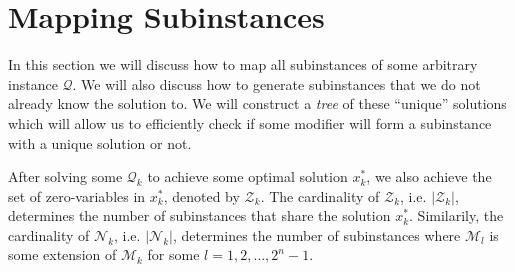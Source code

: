 \section{Mapping Subinstances}
In this section we will discuss how to map all subinstances of some arbitrary
instance $\mathcal{Q}$. We will also discuss how to generate
subinstances that we do not already know the solution to.
We will construct a \emph{tree} of these ``unique'' solutions which will allow
us to efficiently check if some modifier will form a subinstance with a unique
solution or not.

After solving some $\mathcal{Q}_k$ to achieve some optimal solution $x_k^*$, we
also achieve the set of zero-variables in $x_k^*$, denoted by $\mathcal{Z}_k$.
The cardinality of $\mathcal{Z}_k$, i.e. $|\mathcal{Z}_k|$, determines the
number of subinstances that share the solution $x_k^*$.
Similarily, the cardinality of $\mathcal{N}_k$, i.e. $|\mathcal{N}_k|$,
determines the number of subinstances where $\mathcal{M}_l$ is some 
extension of $\mathcal{M}_k$ for some $l=1,2,\ldots,2^n-1$.
